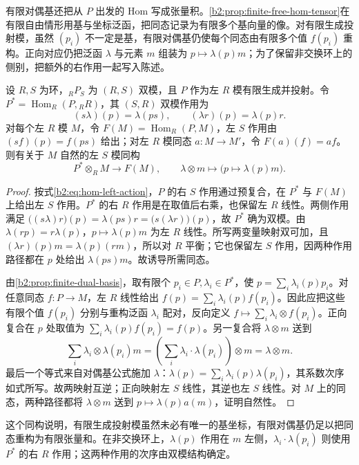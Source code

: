 \ProseParagraphBreak
有限对偶基还把从 \(P\) 出发的 Hom 写成张量积。\cref{b2:prop:finite-free-hom-tensor}在有限自由情形用基与坐标泛函，把同态记录为有限多个基向量的像。对有限生成投射模，虽然 \((p_i)\) 不一定是基，有限对偶基仍使每个同态由有限多个值 \(f(p_i)\) 重构。正向对应仍把泛函 \(\lambda\) 与元素 \(m\) 组装为 \(p\mapsto\lambda(p)m\)；为了保留非交换环上的侧别，把额外的右作用一起写入陈述。

\begin{proposition}\label{b2:prop:finite-projective-hom-tensor}
	设 \(R,S\) 为环，\({}_RP_S\) 为 \((R,S)\) 双模，且 \(P\) 作为左 \(R\) 模有限生成并投射。令 \(P^*=\operatorname{Hom}_R(P,{}_RR)\)，其 \((S,R)\) 双模作用为
	\[
		(s\lambda)(p)=\lambda(ps),\qquad (\lambda r)(p)=\lambda(p)r.
	\]
	对每个左 \(R\) 模 \(M\)，令 \(F(M)=\operatorname{Hom}_R(P,M)\)，左 \(S\) 作用由 \((sf)(p)=f(ps)\) 给出；对左 \(R\) 模同态 \(a:M\to M'\)，令 \(F(a)(f)=af\)。则有关于 \(M\) 自然的左 \(S\) 模同构
	\[
		P^*\otimes_RM\longrightarrow F(M),\qquad \lambda\otimes m\longmapsto\bigl(p\mapsto\lambda(p)m\bigr).
	\]
\end{proposition}
\begin{proof}
	按式\eqref{b2:eq:hom-left-action}，\(P\) 的右 \(S\) 作用通过预复合，在 \(P^*\) 与 \(F(M)\) 上给出左 \(S\) 作用。\(P^*\) 的右 \(R\) 作用是在取值后右乘，也保留左 \(R\) 线性。两侧作用满足 \(\bigl((s\lambda)r\bigr)(p)=\lambda(ps)r=\bigl(s(\lambda r)\bigr)(p)\)，故 \(P^*\) 确为双模。由 \(\lambda(rp)=r\lambda(p)\)，\(p\mapsto\lambda(p)m\) 为左 \(R\) 线性。所写两变量映射双可加，且 \((\lambda r)(p)m=\lambda(p)(rm)\)，所以对 \(R\) 平衡；它也保留左 \(S\) 作用，因两种作用路径都在 \(p\) 处给出 \(\lambda(ps)m\)。故诱导所需同态。

	由\cref{b2:prop:finite-dual-basis}，取有限个 \(p_i\in P,\lambda_i\in P^*\)，使 \(p=\sum_i\lambda_i(p)p_i\)。对任意同态 \(f:P\to M\)，左 \(R\) 线性给出 \(f(p)=\sum_i\lambda_i(p)f(p_i)\)。因此应把这些有限个值 \(f(p_i)\) 分别与重构泛函 \(\lambda_i\) 配对，反向定义 \(f\mapsto\sum_i\lambda_i\otimes f(p_i)\)。正向复合在 \(p\) 处取值为 \(\sum_i\lambda_i(p)f(p_i)=f(p)\)。另一复合将 \(\lambda\otimes m\) 送到
	\[
		\sum_i\lambda_i\otimes\lambda(p_i)m =\left(\sum_i\lambda_i\cdot\lambda(p_i)\right)\otimes m =\lambda\otimes m.
	\]
	最后一个等式来自对偶基公式施加 \(\lambda\)：\(\lambda(p)=\sum_i\lambda_i(p)\lambda(p_i)\)，其系数次序如式所写。故两映射互逆；正向映射左 \(S\) 线性，其逆也左 \(S\) 线性。对 \(M\) 上的同态，两种路径都将 \(\lambda\otimes m\) 送到 \(p\mapsto\lambda(p)a(m)\)，证明自然性。
\end{proof}

这个同构说明，有限生成投射模虽然未必有唯一的基坐标，有限对偶基仍足以把同态重构为有限张量和。在非交换环上，\(\lambda(p)\) 作用在 \(m\) 左侧，\(\lambda_i\cdot\lambda(p_i)\) 则使用 \(P^*\) 的右 \(R\) 作用；这两种作用的次序由双模结构确定。
